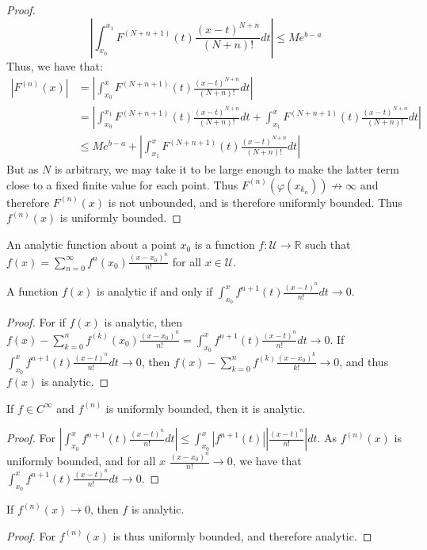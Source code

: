\documentclass[crop=false,class=book,oneside]{standalone}
\begin{document}
\begin{proof}
        \begin{equation*}
            |\int_{x_0}^{x_1} F^{(N+n+1)}(t)\frac{(x-t)^{N+n}}{(N+n)!}dt|\leq Me^{b-a}
        \end{equation*}
        Thus, we have that:
        \begin{align*}
            |F^{(n)}(x)| &= |\int_{x_0}^{x} F^{(N+n+1)}(t)\frac{(x-t)^{N+n}}{(N+n)!}dt|\\ &= |\int_{x_0}^{x_1} F^{(N+n+1)}(t)\frac{(x-t)^{N+n}}{(N+n)!}dt+\int_{x_1}^{x} F^{(N+n+1)}(t)\frac{(x-t)^{N+n}}{(N+n)!}dt|\\
            &\leq Me^{b-a}+|\int_{x_1}^{x} F^{(N+n+1)}(t)\frac{(x-t)^{N+n}}{(N+n)!}dt|
        \end{align*}
        But as $N$ is arbitrary, we may take it to be large enough to make the latter term close to a fixed finite value for each point. Thus $F^{(n)}(\varphi(x_{k_n}))\not\rightarrow \infty$ and therefore $F^{(n)}(x)$ is not unbounded, and is therefore uniformly bounded. Thus $f^{(n)}(x)$ is uniformly bounded.
        \end{proof}
        \begin{definition}
        An analytic function about a point $x_0$ is a function $f:\mathcal{U}\rightarrow\mathbb{R}$ such that $f(x) = \sum_{n=0}^{\infty} f^{n}(x_0) \frac{(x-x_0)^{n}}{n!}$ for all $x\in\mathcal{U}$.
        \end{definition}
        \begin{theorem}
        A function $f(x)$ is analytic if and only if $\int_{x_0}^{x}f^{n+1}(t)\frac{(x-t)^n}{n!}dt\rightarrow 0$.
        \end{theorem}
        \begin{proof}
        For if $f(x)$ is analytic, then $f(x)-\sum_{k=0}^{n} f^{(k)}(x_0)\frac{(x-x_0)^n}{n!} = \int_{x_0}^{x}f^{n+1}(t)\frac{(x-t)^n}{n!}dt \rightarrow 0$. If $\int_{x_0}^{x}f^{n+1}(t)\frac{(x-t)^n}{n!}dt\rightarrow 0$, then $f(x)-\sum_{k=0}^{n}f^{(k)}\frac{(x-x_0)^{k}}{k!}\rightarrow 0$, and thus $f(x)$ is analytic.
        \end{proof}
        \begin{lemma}
        If $f\in C^{\infty}$ and $f^{(n)}$ is uniformly bounded, then it is analytic.
        \end{lemma}
        \begin{proof}
        For $|\int_{x_0}^{x}f^{n+1}(t)\frac{(x-t)^n}{n!}dt|\leq \int_{x_0}^{x}|f^{n+1}(t)||\frac{(x-t)^n}{n!}|dt$. As $f^{(n)}(x)$ is uniformly bounded, and for all $x$ $\frac{(x-x_0)^n}{n!} \rightarrow 0$, we have that $\int_{x_0}^{x}f^{n+1}(t)\frac{(x-t)^n}{n!}dt\rightarrow 0$.
        \end{proof}
        \begin{corollary}
        If $f^{(n)}(x)\rightarrow 0$, then $f$ is analytic.
        \end{corollary}
        \begin{proof}
        For $f^{(n)}(x)$ is thus uniformly bounded, and therefore analytic.
        \end{proof}
\end{document}
